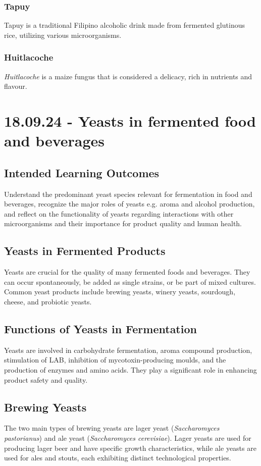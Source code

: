 \subsubsection*{Tapuy}
Tapuy is a traditional Filipino alcoholic drink made from fermented glutinous rice, utilizing various microorganisms.

\subsubsection*{Huitlacoche}
\textit{Huitlacoche} is a maize fungus that is considered a delicacy, rich in nutrients and flavour.

\section{18.09.24 - Yeasts in fermented food and beverages}
\subsection{Intended Learning Outcomes} 
Understand the predominant yeast species relevant for fermentation in food and beverages, recognize the major roles of yeasts e.g. aroma and alcohol production, and reflect on the functionality of yeasts regarding interactions with other microorganisms and their importance for product quality and human health.

\subsection{Yeasts in Fermented Products} 
Yeasts are crucial for the quality of many fermented foods and beverages. They can occur spontaneously, be added as single strains, or be part of mixed cultures. Common yeast products include brewing yeasts, winery yeasts, sourdough, cheese, and probiotic yeasts.

\subsection{Functions of Yeasts in Fermentation} 
Yeasts are involved in carbohydrate fermentation, aroma compound production, stimulation of LAB, inhibition of mycotoxin-producing moulds, and the production of enzymes and amino acids. They play a significant role in enhancing product safety and quality.

\subsection{Brewing Yeasts} 
The two main types of brewing yeasts are lager yeast (\textit{Saccharomyces pastorianus}) and ale yeast (\textit{Saccharomyces cerevisiae}). Lager yeasts are used for producing lager beer and have specific growth characteristics, while ale yeasts are used for ales and stouts, each exhibiting distinct technological properties.

